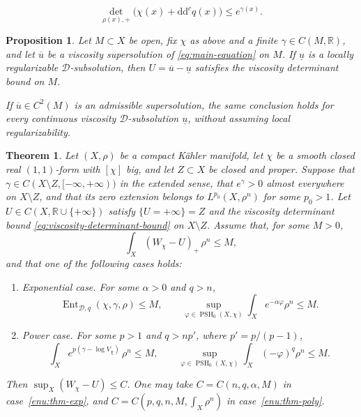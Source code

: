 \documentclass[10pt,a4paper]{amsart}
\newtheorem{prop}{Proposition}
\newtheorem{thm}{Theorem}
\renewcommand{\d}{\mathrm{d}}
\newcommand{\ddc}{\d\d^c}
\begin{document}
	\begin{equation}
		\label{eq:viscosity-determinant-bound}
		\det_{\rho(x),+}\bigl(\chi(x)+\ddc q(x)\bigr)\leq e^{\gamma(x)}.
	\end{equation}

\begin{prop}
	\label{prop:determinant-reduction}
	Let $M\subset X$ be open, fix $\chi$ as above and a finite $\gamma\in C(M,\mathbb R)$, and let
	$\overline u$ be a viscosity supersolution of
	\eqref{eq:main-equation} on $M$. If $\underline u$ is a locally
	regularizable $\mathcal D$-subsolution, then
	$U=\overline u-\underline u$ satisfies the viscosity determinant
	bound on $M$.
	
	If $\overline u\in C^2(M)$ is an admissible supersolution, the same
	conclusion holds for every continuous viscosity
	$\mathcal D$-subsolution $\underline u$, without assuming local
	regularizability.
\end{prop}

\begin{thm}
	\label{thm:determinant-relative-Linfty}
	Let $(X, \rho)$ be a compact K\"{a}hler manifold, let
	$\chi$ be a smooth closed real $(1,1)$-form with $[\chi]$ big,
	and let $Z\subset X$ be closed and proper. Suppose that
	$\gamma\in C(X\setminus Z,[-\infty,+\infty))$ in the extended sense,
	that $e^\gamma>0$ almost everywhere on $X\setminus Z$, and that
	its zero extension belongs to $L^{p_0}(X,\rho^n)$ for some $p_0>1$.
	Let $U\in C(X,\mathbb R\cup\{+\infty\})$ satisfy
	$\{U=+\infty\}=Z$ and the viscosity determinant bound
	\eqref{eq:viscosity-determinant-bound} on $X\setminus Z$.
	Assume that, for some $M>0$,
	\begin{equation}
		\label{eq:thm-L1-hypothesis}
		\int_X(W_\chi-U)_+\,\rho^n\leq M,
	\end{equation}
	and that one of the following cases holds:
	\begin{enumerate}[label=\textnormal{(\alph*)}]
		\item\label{enu:thm-exp}
		\emph{Exponential case.} For some $\alpha>0$ and $q>n$,
		\[
		\operatorname{Ent}_{\mathcal D,q}(\chi,\gamma,\rho)\leq M,
		\qquad
		\sup_{\varphi\in\operatorname{PSH}_0(X,\chi)}
		\int_Xe^{-\alpha\varphi}\rho^n\leq M.
		\]
		\item\label{enu:thm-poly}
		\emph{Power case.} For some $p>1$ and $q>np'$, where $p'=p/(p-1)$,
		\[
		\int_X e^{p(\gamma-\log V_\chi)}\,\rho^n\leq M,
		\qquad
		\sup_{\varphi\in\operatorname{PSH}_0(X,\chi)}
		\int_X(-\varphi)^q\rho^n\leq M.
		\]
	\end{enumerate}
	Then $\sup_X(W_\chi-U)\leq C$. One may take
	$C=C(n,q,\alpha,M)$ in case~\ref{enu:thm-exp}, and
	$C=C(p,q,n,M,\int_X \rho^n)$ in case~\ref{enu:thm-poly}.
\end{thm}
\end{document}
